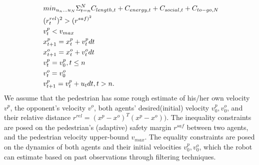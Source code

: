 \documentclass[conference]{IEEEtran}
\begin{document}
\begin{equation}~\label{eq:receding_control}
  \begin{aligned}
    &min_{u_n \dots u_N} \Sigma^N_{t=n} \small{C_{length,t} + C_{energy,t} + C_{social,t}} + C_{to-go,N}\\
    & (r^{rel}_t)^2 > (r^{{saf})^2}\\
    & v^p_t < v_{max}\\
    & x^p_{t+1} = x^p_t + v^p_t \scriptsize{d}t\\
    & x^o_{t+1} = x^o_t + v^o_t \scriptsize{d}t\\
    & v^p_t = v^p_0, t \leq n\\
    & v^o_t = v^o_0\\
    & v^p_{t+1} = v^p_t + u_t \scriptsize{d}t, t>n.
 \end{aligned}
\end{equation}
We assume that the pedestrian has some rough estimate of 
his/her own velocity $v^p$, the opponent's velocity $v^o$, both agents' 
desired(initial) velocity $v^p_0, v^o_0$, and their relative distance 
$r^{rel} = (x^p-x^o)^T(x^p-x^o))$.
The inequality constraints are posed on the pedestrian's (adaptive) safety margin 
$r^{saf}$ between two 
agents, and the pedestrian velocity upper-bound $v_{max}$. 
The equality constraints are posed on the 
dynamics of both agents and their initial velocities 
$v^p_0, v^o_0$, which the robot can estimate based on past 
observations through filtering techniques. 
\end{document}
